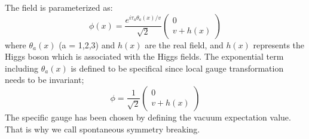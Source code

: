 
The field is parameterized as:
\begin{equation}
\phi(x)=\frac{e^{i \tau_{a} \theta_{a}(x) / v}}{\sqrt{2}}\left(\begin{array}{c}
0 \\
v+h(x)
\end{array}\right)
\end{equation}
where $\theta_{a}(x)$ (a = 1,2,3) and $h(x)$ are the real field, and  $h(x)$ represents the Higgs boson which is associated with the Higgs fields. The exponential term including $\theta_{a}(x)$ is defined to be specifical since local gauge transformation needs to be invariant;
\begin{equation}
\phi=\frac{1}{\sqrt{2}}\left(\begin{array}{c}
0 \\
v+h(x)
\end{array}\right)
\end{equation}
The specific gauge has been chosen by defining the vacuum expectation value. That is why we call spontaneous symmetry breaking. 

